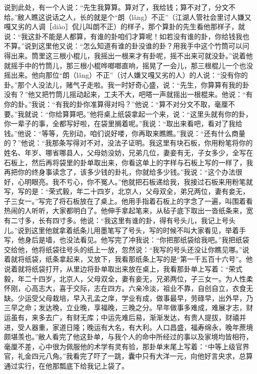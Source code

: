 \documentclass[12pt,UTF8]{ctexbook}
\begin{document}
说到此处，有一个人说：“先生我算算。算对了，我给钱；算不对了，分文不给。”敝人瞧这说话之人，长的就是个“朗（lǎng）不正”（江湖人管社会里讨人嫌又嘎又劣的人调［diào］侃儿叫朗不正）的样子，那个算卦的先生看他那样子，就说：“我这卦不能是人都算，有谁的卦咱们才算呢！如若没有谁的卦，你给钱我也不算。”说到这里他又说：“怎么知道有谁的卦没谁的卦？用我手中这个竹筒可以问得出来。筒里这三根小棍儿，我摇出一根来才有卦呢，摇不出来可就没卦。”说着他就摇手中的竹筒儿，那三根小棍哗啷啷直响，摇晃了一会儿，那三根棍儿一个也没摇出来。他向那位“朗（lǎng）不正”（讨人嫌又嘎又劣的人）的人说：“没有你的卦。”那个人没法儿，赌气子走啦。我一时好奇心盛，说：“先生，你算算有我的卦没有？”他又把竹筒儿摇动起来，工夫不大，吧嗒一声就摇出一根棍来。他说：“有你的卦。”我说：“有我的卦你准算得对吗？”他说：“算不对分文不取，毫厘不要。”我就说：“你给算算吧。”他将桌上纸袋拿起一个来，说：“这里头就有你的卦，你一辈子的事，全都写好啦，在袋里搁着呢。”我说：“取出来看吧，看对了我给钱。”他说：“等等，先别动，咱们说好喽，你再取来瞧瞧。”我说：“还有什么商量的？”他说：“我那条写得对不对，没法子证明。我这里有块石板，你用粉笔将你的姓名、年岁、哪省哪县人，父母妨没妨，兄弟几位，妻妾有无，子女多少，全写在石板上，然后再将袋里的卦单取出来，你看这单上的字样与石板上写的一样了，我再把你的终身事读念了，该多少钱的卦礼，你就给多少钱。”我说：“这个办法很好，心明眼亮。我不亏心，你不冤人。”他就把石板递给我，我接过石板来用粉笔就写，写的是：“荣式毅，年二十四岁，北京人，父母双全，弟兄两位，妻有妾无，子三女一。”写完了将石板放在了桌上。他用手指着石板上的字念了一遍，叫围着看热闹的人听听，大家都明白了。他伸手拿起笔来，从毡子底下取出一沓纸条来，宽有二寸多，长有四寸多。他说：“我这里有谁的卦，得有号头儿，我记上号头儿。”说到这里他就拿着纸条儿用墨笔写了号头，写的时候不叫大家看见，举着手写，他身后是墙，也没法看见。他写完了冲我说：“你把那纸袋给我吧。”我把纸袋交给他，他将纸袋往号头的纸上一放，忽然说：“我写的号头还没让你瞧见哪。”说着就将纸袋，纸条拿起来，又放下，我看那纸条上写的是“第一千五百十六号”。他说着就将纸袋打开，从里边将卦单取出来放在桌上，我看那卦单上写着：“荣式毅，年二十四岁，北京人，父母双全，妻有妾无，兄弟两位，子三女一。为人性柔怀刚，心高志大，喜于交际，志在四方。六亲冷淡，祖业不靠，自创自立，衣食无缺。少运受父母栽培，早入孔孟之庠，学业有成，做事最早，劳碌早，出外早，乃三早之命；发达晚，立业晚，享福晚，三晚之分。早年做事多难成，难展才志，财运虽有，来多去广，有财无库；中运先难后易，渐渐发达，有贵人提拔，财禧并进，受人器重，家道日隆；晚运有大名，有大利。人口昌盛，福寿绵永，晚年蔗境颇堪羡也。”敝人看完了他这卦单，与我个人的命中所经过的事以及家境均皆相符，毫厘不差，心中很为佩服他的术学有灵有验，那卦单末尾上写着：“中等上级官界官，礼金四元八角。”我看完了吓了一跳，囊中只有大洋一元，向他好言央求，总算通过实行，在他那瓢底下给我记上袋了。
\end{document}
